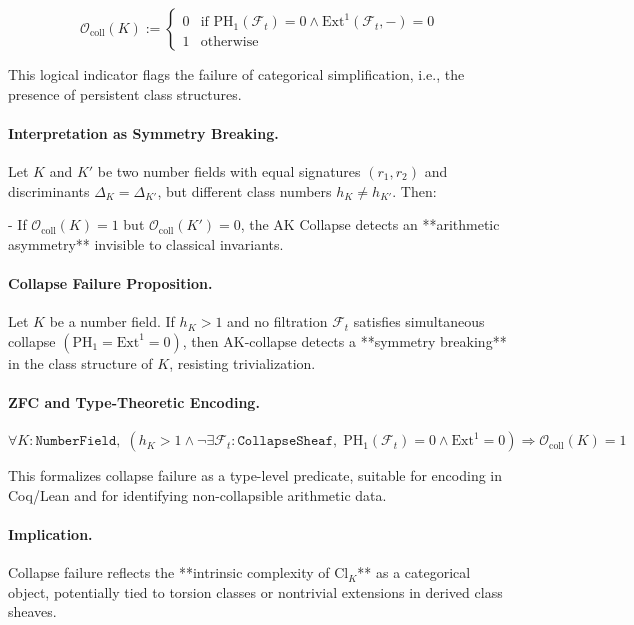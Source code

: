 \documentclass[11pt]{article}
\begin{document}
\[
\mathcal{O}_{\mathrm{coll}}(K) := 
\left\{
  \begin{array}{ll}
    0 & \text{if } \mathrm{PH}_1(\mathcal{F}_t) = 0 \wedge \mathrm{Ext}^1(\mathcal{F}_t, -) = 0 \\
    1 & \text{otherwise}
  \end{array}
\right.
\]

This logical indicator flags the failure of categorical simplification, i.e., the presence of persistent class structures.

\paragraph{Interpretation as Symmetry Breaking.}
Let \( K \) and \( K' \) be two number fields with equal signatures \( (r_1, r_2) \) and discriminants \( \Delta_K = \Delta_{K'} \), but different class numbers \( h_K \ne h_{K'} \). Then:

- If \( \mathcal{O}_{\mathrm{coll}}(K) = 1 \) but \( \mathcal{O}_{\mathrm{coll}}(K') = 0 \),  
the AK Collapse detects an **arithmetic asymmetry** invisible to classical invariants.

\paragraph{Collapse Failure Proposition.}
\begin{proposition}
Let \( K \) be a number field. If \( h_K > 1 \) and no filtration \( \mathcal{F}_t \) satisfies simultaneous collapse \( (\mathrm{PH}_1 = \mathrm{Ext}^1 = 0) \),  
then AK-collapse detects a **symmetry breaking** in the class structure of \( K \), resisting trivialization.
\end{proposition}

\paragraph{ZFC and Type-Theoretic Encoding.}

\[
\forall K : \texttt{NumberField},\;
(h_K > 1 \wedge \neg \exists \mathcal{F}_t : \texttt{CollapseSheaf},\;
\mathrm{PH}_1(\mathcal{F}_t) = 0 \wedge \mathrm{Ext}^1 = 0)
\Rightarrow \mathcal{O}_{\mathrm{coll}}(K) = 1
\]

This formalizes collapse failure as a type-level predicate, suitable for encoding in Coq/Lean and for identifying non-collapsible arithmetic data.

\paragraph{Implication.}
Collapse failure reflects the **intrinsic complexity of \( \mathrm{Cl}_K \)** as a categorical object, potentially tied to torsion classes or nontrivial extensions in derived class sheaves.
\end{document}
